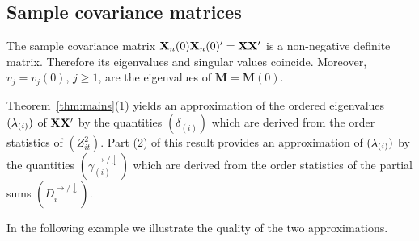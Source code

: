 \subsection{Sample covariance matrices}\label{sec:samplecov}
The sample covariance matrix ${\mathbf X}_n(0){\mathbf X}_n(0)'={\mathbf X}{\mathbf X}'$ is a non-negative definite matrix. Therefore
its eigenvalues and singular values coincide.  Moreover, $v_j=v_j(0)$, $j\ge 1$, are the eigenvalues of $\mathbf M=\mathbf M(0)$.
\par
Theorem~\ref{thm:mains}(1) yields an approximation of the ordered eigenvalues $(\lambda_{(i)})$ of ${\mathbf X}{\mathbf X}'$ by
the quantities $(\delta_{(i)})$ which are derived from the order statistics of $(Z_{it}^2)$.
Part (2) of this result provides an approximation of $(\lambda_{(i)})$ by the quantities
$(\gamma_{(i)}^{\rightarrow/\downarrow})$ which are derived from the order statistics
of the partial sums $(D_i^{\rightarrow/\downarrow})$.
\par
In the following example we illustrate the
quality of the two approximations.
